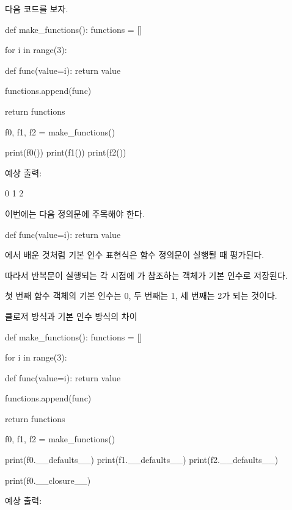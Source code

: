 다음 코드를 보자.

\begin{dhkcode}
def make_functions():
    functions = []

    for i in range(3):

        def func(value=i):
            return value

        functions.append(func)

    return functions


f0, f1, f2 = make_functions()

print(f0())
print(f1())
print(f2())
\end{dhkcode}

예상 출력:

\begin{dhkzsh}
0
1
2
\end{dhkzsh}

이번에는 다음 정의문에 주목해야 한다.

\begin{dhkcode}
def func(value=i):
    return value
\end{dhkcode}

에서 배운 것처럼 기본 인수 표현식은 함수 정의문이 실행될 때 평가된다.

따라서 반복문이 실행되는 각 시점에 가 참조하는 객체가 기본 인수로 저장된다.

첫 번째 함수 객체의 기본 인수는 0, 두 번째는 1, 세 번째는 2가 되는 것이다.

\begin{dhknote}
\begin{dhksmry}[centered]
클로저 방식과 기본 인수 방식의 차이
\end{dhksmry}
\end{dhknote}

\begin{dhkcode}
def make_functions():
    functions = []

    for i in range(3):

        def func(value=i):
            return value

        functions.append(func)

    return functions


f0, f1, f2 = make_functions()

print(f0.__defaults__)
print(f1.__defaults__)
print(f2.__defaults__)

print(f0.__closure__)
\end{dhkcode}

예상 출력:

